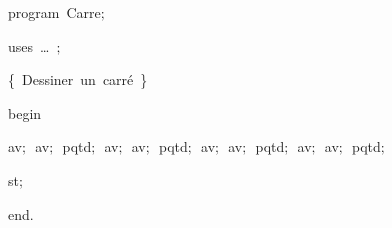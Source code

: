 
{
\parindent {}
\medskip

\carrenoir
\vspace{\neglskip}\mbox{\blc  \idt  \mcl program\idt \ Carre$;$
}\par 
\vspace{\neglskip}\mbox{\blc \blk\idt \mcl uses\idt \ \ldots\ $;$
}\par 
\vspace{\neglskip}\mbox{\blc  \blk\idt  \cmt  \{\ Dessiner\ un\ carré\ \}\idt }\par 
\vspace{\neglskip}\mbox{\blc  \idt  \mcl begin\idt }\par 
\vspace{\neglskip}\mbox{\blc  \blk\idt  av$;$\ av$;$\ pqtd$;$\ av$;$\ av$;$\ pqtd$;$\ av$;$\ av$;$\ pqtd$;$\ av$;$\ av$;$\ pqtd$;$}\par 
\vspace{\neglskip}\mbox{\blc  \blk\idt  st$;$\ }\par 
\vspace{\neglskip}\mbox{\blc  \idt  \mcl end\idt $.$}\par 

\medskip }

